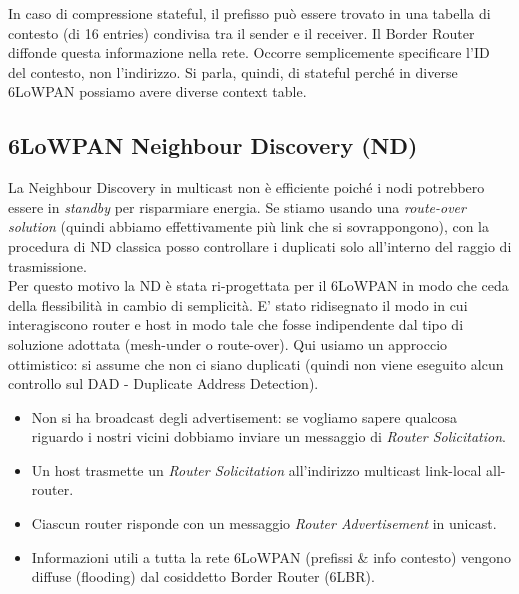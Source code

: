 \documentclass{article}
\begin{document}
In caso di compressione stateful, il prefisso può essere trovato in una tabella di contesto (di 16 entries) condivisa tra il sender e il receiver. Il Border Router diffonde questa informazione nella rete. Occorre semplicemente specificare l'ID del contesto, non l'indirizzo. Si parla, quindi, di stateful perché in diverse 6LoWPAN possiamo avere diverse context table.

\subsection{6LoWPAN Neighbour Discovery (ND)}
La Neighbour Discovery in multicast non è efficiente poiché i nodi potrebbero essere in \textit{standby} per risparmiare energia. Se stiamo usando una \textit{route-over solution} (quindi abbiamo effettivamente più link che si sovrappongono), con la procedura di ND classica posso controllare i duplicati solo all'interno del raggio di trasmissione. \\
Per questo motivo la ND è stata ri-progettata per il 6LoWPAN in modo che ceda della flessibilità in cambio di semplicità. E' stato ridisegnato il modo in cui interagiscono router e host in modo tale che fosse indipendente dal tipo di soluzione adottata (mesh-under o route-over). Qui usiamo un approccio ottimistico: si assume che non ci siano duplicati (quindi non viene eseguito alcun controllo sul DAD - Duplicate Address Detection).
\begin{itemize}
    \item Non si ha broadcast degli advertisement: se vogliamo sapere qualcosa riguardo i nostri vicini dobbiamo inviare un messaggio di \textit{Router Solicitation}.
    \item Un host trasmette un \textit{Router Solicitation} all'indirizzo multicast link-local all-router.
    \item Ciascun router risponde con un messaggio \textit{Router Advertisement} in unicast.
    \item Informazioni utili a tutta la rete 6LoWPAN (prefissi \& info contesto) vengono diffuse (flooding) dal cosiddetto Border Router (6LBR).
\end{itemize}
\end{document}
